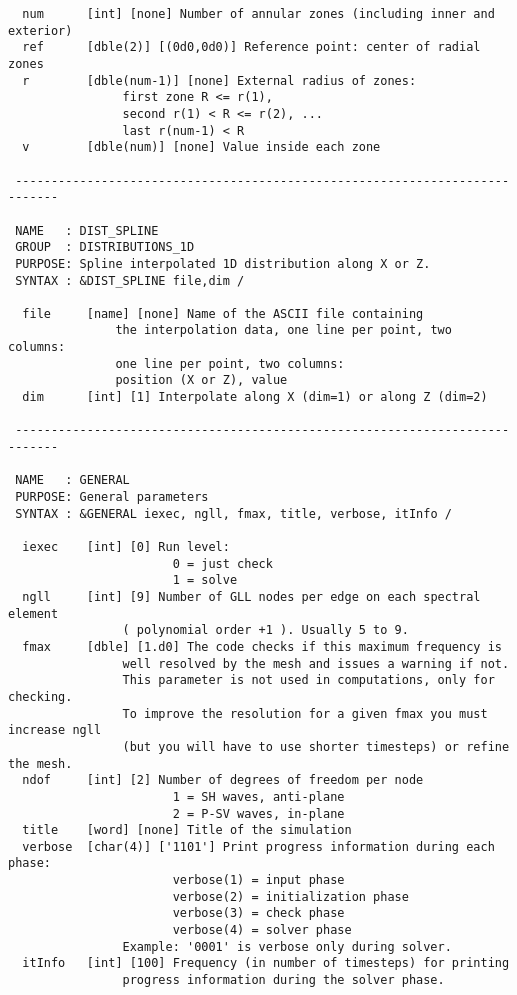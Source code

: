 \begin{verbatim}
  num      [int] [none] Number of annular zones (including inner and exterior)
  ref      [dble(2)] [(0d0,0d0)] Reference point: center of radial zones
  r        [dble(num-1)] [none] External radius of zones:
                first zone R <= r(1), 
                second r(1) < R <= r(2), ...
                last r(num-1) < R 
  v        [dble(num)] [none] Value inside each zone

 ----------------------------------------------------------------------------

 NAME   : DIST_SPLINE
 GROUP  : DISTRIBUTIONS_1D
 PURPOSE: Spline interpolated 1D distribution along X or Z.
 SYNTAX : &DIST_SPLINE file,dim /

  file     [name] [none] Name of the ASCII file containing
               the interpolation data, one line per point, two columns: 
               one line per point, two columns: 
               position (X or Z), value
  dim      [int] [1] Interpolate along X (dim=1) or along Z (dim=2)

 ----------------------------------------------------------------------------

 NAME   : GENERAL
 PURPOSE: General parameters
 SYNTAX : &GENERAL iexec, ngll, fmax, title, verbose, itInfo /

  iexec    [int] [0] Run level:
                       0 = just check
                       1 = solve
  ngll     [int] [9] Number of GLL nodes per edge on each spectral element
                ( polynomial order +1 ). Usually 5 to 9.
  fmax     [dble] [1.d0] The code checks if this maximum frequency is
                well resolved by the mesh and issues a warning if not. 
                This parameter is not used in computations, only for checking.
                To improve the resolution for a given fmax you must increase ngll 
                (but you will have to use shorter timesteps) or refine the mesh.
  ndof     [int] [2] Number of degrees of freedom per node
                       1 = SH waves, anti-plane
                       2 = P-SV waves, in-plane
  title    [word] [none] Title of the simulation
  verbose  [char(4)] ['1101'] Print progress information during each phase:
                       verbose(1) = input phase
                       verbose(2) = initialization phase
                       verbose(3) = check phase
                       verbose(4) = solver phase
                Example: '0001' is verbose only during solver.
  itInfo   [int] [100] Frequency (in number of timesteps) for printing
                progress information during the solver phase.


\end{verbatim}
